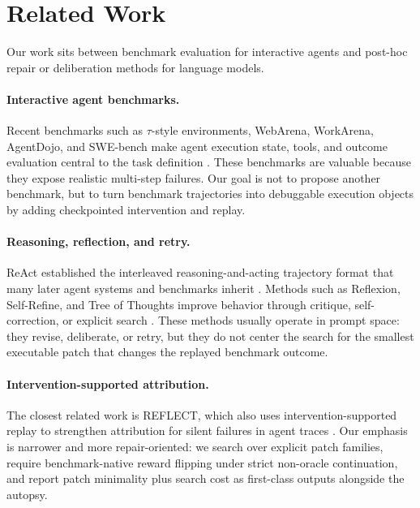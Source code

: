 \documentclass{article}
\begin{document}
\section{Related Work}

Our work sits between benchmark evaluation for interactive agents and
post-hoc repair or deliberation methods for language models.

\paragraph{Interactive agent benchmarks.}
Recent benchmarks such as $\tau$-style environments, WebArena, WorkArena,
AgentDojo, and SWE-bench make agent execution state, tools, and outcome
evaluation central to the task definition
\citep{tau_style,web_arena,work_arena,agent_dojo,swe_bench}. These benchmarks
are valuable because they expose realistic multi-step failures. Our goal is not
to propose another benchmark, but to turn benchmark trajectories into
debuggable execution objects by adding checkpointed intervention and replay.

\paragraph{Reasoning, reflection, and retry.}
ReAct established the interleaved reasoning-and-acting trajectory format that
many later agent systems and benchmarks inherit \citep{react}. Methods such as
Reflexion, Self-Refine, and Tree of Thoughts improve behavior through critique,
self-correction, or explicit search \citep{reflexion,self_refine,tree_of_thoughts}.
These methods usually operate in prompt space: they revise, deliberate, or
retry, but they do not center the search for the smallest executable patch that
changes the replayed benchmark outcome.

\paragraph{Intervention-supported attribution.}
The closest related work is REFLECT, which also uses intervention-supported
replay to strengthen attribution for silent failures in agent traces
\citep{reflect}. Our emphasis is narrower and more repair-oriented: we search
over explicit patch families, require benchmark-native reward flipping under
strict non-oracle continuation, and report patch minimality plus search cost as
first-class outputs alongside the autopsy.
\end{document}
